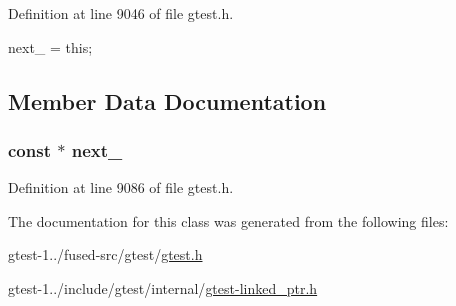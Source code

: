 \-Definition at line 9046 of file gtest.\-h.


\begin{DoxyCode}
                  {
    next_ = this;
  }
\end{DoxyCode}


\subsection{\-Member \-Data \-Documentation}
\hypertarget{classtesting_1_1internal_1_1linked__ptr__internal_a3373437814bc3d37f0f3d4b821698b71}{
\subsubsection[{next\-\_\-}]{ const $\ast$ {\bf next\-\_\-}}}\label{d7/d67/classtesting_1_1internal_1_1linked__ptr__internal_a3373437814bc3d37f0f3d4b821698b71}


\-Definition at line 9086 of file gtest.\-h.



\-The documentation for this class was generated from the following files\-:\begin{DoxyCompactItemize}
\item 
gtest-\/1../fused-\/src/gtest/\hyperlink{fused-src_2gtest_2gtest_8h}{gtest.\-h}\item 
gtest-\/1../include/gtest/internal/\hyperlink{gtest-linked__ptr_8h}{gtest-\/linked\-\_\-ptr.\-h}\end{DoxyCompactItemize}
